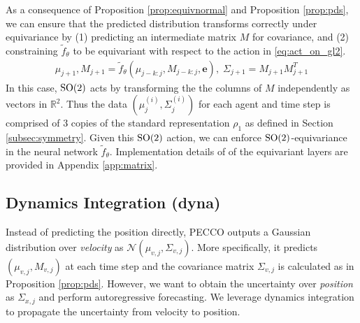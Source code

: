 As a consequence of Proposition \ref{prop:equivnormal} and Proposition \ref{prop:pds}, we can ensure that the predicted distribution transforms correctly under equivariance by (1) predicting an intermediate matrix $M$ for covariance, and (2) constraining $\tilde{f}_\theta$ to be equivariant with respect to the action in \autoref{eq:act_on_gl2}.
\begin{equation} \label{eq:ftheta}
\begin{aligned}    
    \mu_{j+1},M_{j+1} = \tilde{f}_\theta(\mu_{j-k:j}, M_{j-k:j}, \mathbf{e}), \;
    \Sigma_{j+1} = M_{j+1}M_{j+1}^T
\end{aligned}
\end{equation}
In this case, $\mathrm{SO}(2)$ acts by transforming the the columns of $M$ independently as vectors in $\mathbb{R}^2$.  Thus the data $(\mu_j^{(i)},\Sigma_j^{(i)})$ for each agent and time step is comprised of 3 copies of the standard representation $\rho_1$ as defined in Section \ref{subsec:symmetry}.  Given this $\mathrm{SO}(2)$ action, we can enforce $\mathrm{SO}(2)$-equivariance in the neural network $\tilde{f}_\theta$. Implementation details of  of the equivariant layers are provided in Appendix \ref{app:matrix}.






\subsection{Dynamics Integration (dyna)} 
\label{sec:dyn_inte}
Instead of predicting the position directly, PECCO outputs a Gaussian distribution over \emph{velocity} as $\mathcal{N}(\mu_{v,j}, \Sigma_{v,j})$. More specifically, it predicts $(\mu_{v,j}, M_{v,j})$ at each time step and the covariance matrix $\Sigma_{v,j}$ is calculated as in Proposition \ref{prop:pds}. However, we want to obtain the  uncertainty over \textit{position} as $\Sigma_{x,j}$ and perform autoregressive forecasting. We leverage dynamics integration to propagate the uncertainty from velocity to position.


